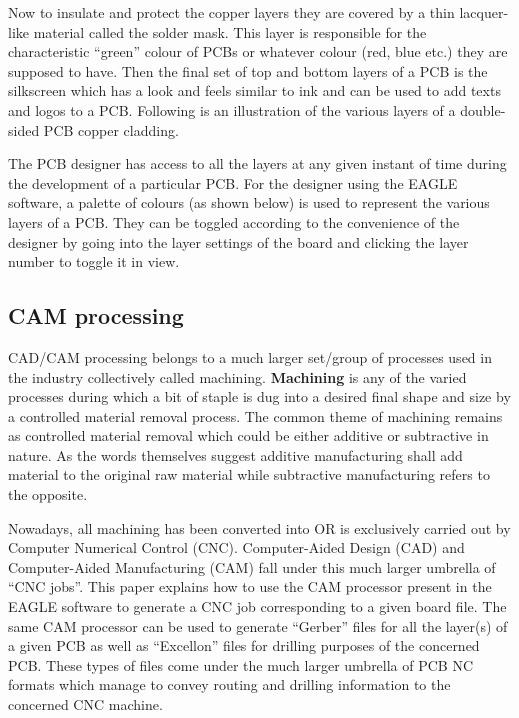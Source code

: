Now to insulate and protect the copper layers they are covered by a thin lacquer-like material called the solder mask. This layer is responsible for the characteristic “green” colour of PCBs or whatever colour (red, blue etc.) they are supposed to have. Then the final set of top and bottom layers of a PCB is the silkscreen which has a look and feels similar to ink and can be used to add texts and logos to a PCB. Following is an illustration of the various layers of a double-sided PCB copper cladding. \par



The PCB designer has access to all the layers at any given instant of time during the development of a particular PCB. For the designer using the EAGLE software, a palette of colours (as shown below) is used to represent the various layers of a PCB. They can be toggled according to the convenience of the designer by going into the layer settings of the board and clicking the layer number to toggle it in view.

\subsection{CAM processing}

CAD/CAM processing belongs to a much larger set/group of processes used in the industry collectively called machining. \textbf{Machining} is any of the varied processes during which a bit of staple is dug into a desired final shape and size by a controlled material removal process. The common theme of machining remains as controlled material removal which could be either additive or subtractive in nature. As the words themselves suggest additive manufacturing shall add material to the original raw material while subtractive manufacturing refers to the opposite.  \par

Nowadays, all machining has been converted into OR is exclusively carried out by Computer Numerical Control (CNC). Computer-Aided Design (CAD) and Computer-Aided Manufacturing (CAM) fall under this much larger umbrella of  “CNC jobs”. This paper explains how to use the CAM processor present in the EAGLE software to generate a CNC job corresponding to a given board file. The same CAM processor can be used to generate  “Gerber” files for all the layer(s) of a given PCB as well as “Excellon” files for drilling purposes of the concerned  PCB. These types of files come under the much larger umbrella of PCB NC formats which manage to convey routing and drilling information to the concerned CNC machine. \par

